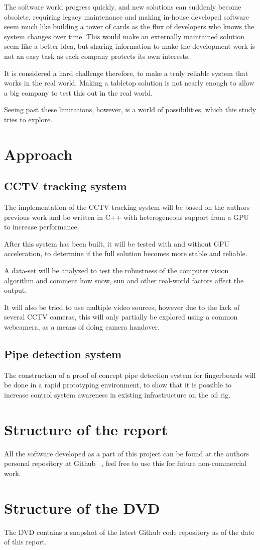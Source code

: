 The software world progress quickly, and new solutions can suddenly become obsolete, requiring legacy maintenance and making in-house developed software seem much like building a tower of cards as the flux of developers who knows the system changes over time. This would make an externally maintained solution seem like a better idea, but sharing information to make the development work is not an easy task as each company protects its own interests.

It is considered a hard challenge therefore, to make a truly reliable system that works in the real world. Making a tabletop solution is not nearly enough to allow a big company to test this out in the real world.

Seeing past these limitations, however, is a world of possibilities, which this study tries to explore.

\section{Approach}
\subsection{CCTV tracking system}
The implementation of the CCTV tracking system will be based on the authors previous work and be written in C++ with heterogeneous support from a GPU to increase performance.

After this system has been built, it will be tested with and without GPU acceleration, to determine if the full solution becomes more stable and reliable.

A data-set will be analyzed to test the robustness of the computer vision algorithm and comment how snow, sun and other real-world factors affect the output.

It will also be tried to use multiple video sources, however due to the lack of several CCTV cameras, this will only partially be explored using a common webcamera, as a means of doing camera handover.

\subsection{Pipe detection system}
The construction of a proof of concept pipe detection system for fingerboards will be done in a rapid prototyping environment, to show that it is possible to increase control system awareness in existing infrastructure on the oil rig.

\section{Structure of the report}
All the software developed as a part of this project can be found at the authors personal repository at Github ~\cite{github}, feel free to use this for future non-commercial work.

\section{Structure of the DVD}
The DVD contains a snapshot of the latest Github code repository as of the date of this report.